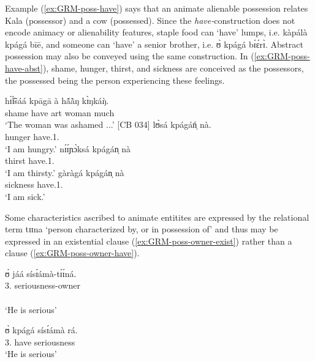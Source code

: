 Example (\ref{ex:GRM-poss-have}) says that an animate alienable possession
relates  Kala (possessor) and a cow (possessed).  Since the  {\it
have-}construction does not encode animacy or alienability features,   staple
food can `have' lumps, i.e. {\sls kàpálà kpágá bīē}, and someone can `have' a
senior brother, i.e. {\sls ʊ̀ kpágá bɪ́ɛ́rɪ̀}.  Abstract possession may also be
conveyed using the same construction. In (\ref{ex:GRM-poss-have-abst}),
  shame, hunger,  thirst, and sickness are conceived as the possessors, the
possessed being the person experiencing these feelings. 



\ea\label{ex:GRM-poss-have-abst}

 \ea\label{ex:GRM-poss-have-abst-1}
\gll hɪ̃̀ɪ̃̀sáá kpāgā   à   hã́ã̀ŋ kɪ̀ŋkáŋ̀.\\
shame    have {\sc art}   woman much\\
\glt `The woman was ashamed ...' [CB 034]
\ex\label{ex:GRM-poss-have-abst-2}
\gll lʊ̀sá kpágáń̩ nà.\\
hunger have.{1.\sg} {\foc}\\
\glt `I am hungry.'
\ex\label{ex:GRM-poss-have-abst-3}
\gll  nɪ́ɪ́ɲɔ̀ksá kpágán̩ nà\\
thirst have.{1.\sg} {\foc}\\
\glt  `I am thirsty.'
\ex\label{ex:GRM-poss-have-abst-4}
\gll  gàràgá kpágán̩ nà\\
sickness have.{1.\sg} {\foc}\\
\glt  `I am sick.'

\z 
 \z

Some characteristics ascribed to animate entitites are expressed by the
relational term {\sls tɪɪna} `person characterized by, or in possession of' and thus may be expressed in an existential clause (\ref{ex:GRM-poss-owner-exist}) rather than a  clause (\ref{ex:GRM-poss-owner-have}). 



\ea\label{ex:GRM-poss-owner}

 \ea\label{ex:GRM-poss-owner-exist}
\glll ʊ̀ jáá sísɪ́ámà-tɪ́ɪ́ná.\\
{3.\sg} {\ident} seriousness-owner\\
  {\psor} {}   {\psed}\\
\glt `He is serious'

 \ex\label{ex:GRM-poss-owner-have}
\gll ʊ̀ kpágá sísɪ́ámà rá.\\
{3.\sg} have {seriousness} {\foc}\\
\glt `He is serious'

